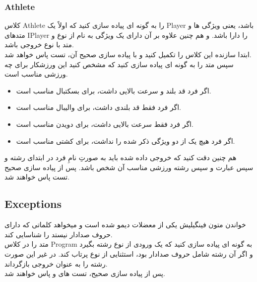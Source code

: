         \subsubsection{Athlete}
        کلاس 
        Athlete
        را به گونه ای پیاده سازی کنید که اولاً یک Player باشد، یعنی ویژگی ها و متدهای IPlayer را دارا باشد.
        و هم چنین علاوه بر آن دارای یک  ویژگی به نام 
        از نوع
        \grayBox{\textcolor{blue}{string}}
        و متد
        با نوع خروجی 
        \grayBox{\textcolor{blue}{string}}
        باشد.
        \\
        ابتدا سازنده این کلاس را تکمیل کنید و با پیاده سازی صحیح آن، تست 
        \grayBox{\textcolor{dkgreen}{AthleteCostructorTest}}
        پاس خواهد شد.
        \\
        سپس متد 
        را به گونه ای پیاده سازی کنید که مشخص کنید این ورزشکار برای چه ورزشی مناسب است.
        \begin{itemize}
            \item اگر فرد قد بلند و سرعت بالایی داشت، برای بسکتبال مناسب است.
            
            \item اگر فرد فقط قد بلندی داشت، برای والیبال مناسب است.
            
            \item اگر فرد فقط سرعت بالایی داشت، برای دویدن مناسب است.
            
            \item اگر فرد هیچ یک از دو ویژگی ذکر شده را نداشت، برای کشتی مناسب است.
        \end{itemize}
        هم چنین دقت کنید که خروجی داده شده باید به صورتِ
        نامِ فرد در ابتدای رشته و سپس عبارت 
        و سپس رشته ورزشی مناسب آن شخص باشد.
        پس از پیاده سازی صحیح تست 
        \grayBox{\textcolor{dkgreen}{AthletePost}}
        پاس خواهند شد.
    \subsection{Exceptions}
    خواندن متون فینگیلیش یکی از معضلات دیمو شده است و میخواهد کلماتی که دارای حروف صدادار نیستد را شناسایی کند.
    \\
    متد 
    را در کلاس Program
    به گونه ای پیاده سازی کنید
    که یک ورودی از نوع رشته بگیرد و اگر آن رشته شامل حروف صدادار بود، استثنایی از نوع 
    پرتاب کند. در غیر این صورت رشته 
    را به عنوان خروجی بازگرداند.
    \\
    پس از پیاده سازی صحیح، تست های 
    \grayBox{\textcolor{dkgreen}{VowelSound}}
    و
    \grayBox{\textcolor{dkgreen}{VowelNotFound}}
    پاس خواهند شد.
    \\
    \\
    \\
    \\
    